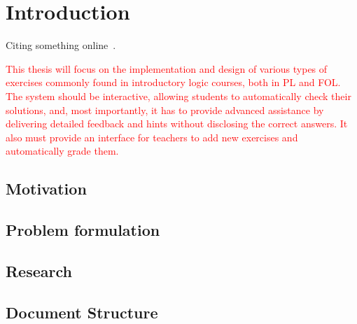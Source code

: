 
%

\chapter{Introduction}
Citing something online~\cite{arxivIltisLearning,arxiv}.

\textcolor{red}{
    This thesis will focus on the implementation and design of various types of exercises commonly found in introductory logic courses, both in PL and FOL. The system should be interactive, allowing students to automatically check their solutions, and, most importantly, it has to provide advanced assistance by delivering detailed feedback and hints without disclosing the correct answers. It also must provide an interface for teachers to add new exercises and automatically grade them.
}


\section{Motivation}

\section{Problem formulation}
\section{Research}
\section{Document Structure}





